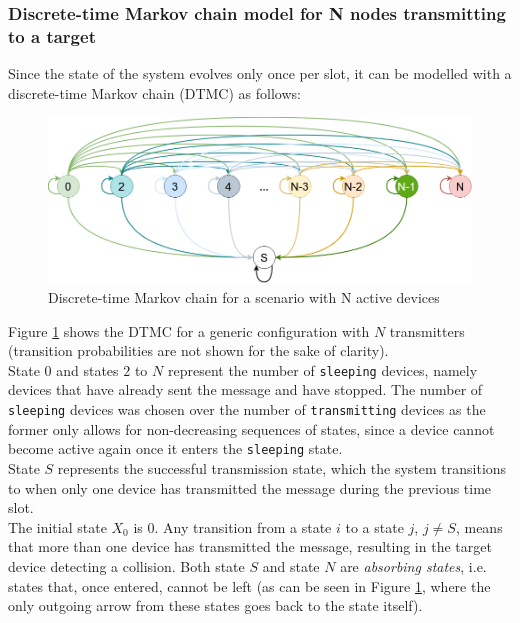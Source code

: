 \subsubsection{Discrete-time Markov chain model for N nodes transmitting to a target}
Since the state of the system evolves only once per slot, it can be modelled
with a discrete-time Markov chain (DTMC) as follows:
\begin{figure}[H]
    \begin{center}
        \includegraphics[scale=0.4]{img/DTMC.png}
        \caption{Discrete-time Markov chain for a scenario with N active devices}
        \label{fig:dtmc}
    \end{center}
\end{figure}
\noindent Figure \ref{fig:dtmc} shows the DTMC for a generic configuration with
$N$ transmitters (transition probabilities are not shown for the sake of clarity).\\
State $0$ and states $2$ to $N$ represent the number of \texttt{sleeping}
devices, namely devices that have already sent the message and have stopped. The
number of \texttt{sleeping} devices was chosen over the number of
\texttt{transmitting} devices as the former only allows for non-decreasing
sequences of states, since a device cannot become active again once it enters
the \texttt{sleeping} state.\\
State $S$ represents the successful transmission state, which the system
transitions to when only one device has transmitted the message during the
previous time slot.\\
The initial state $X_{0}$ is $0$. Any transition from a state $i$ to a state
$j$, $j \neq S$, means that more than one device has transmitted the message, 
resulting in the target device detecting a collision.
Both state $S$ and state $N$ are \textit{absorbing states}, i.e. states that,
once entered, cannot be left (as can be seen in Figure \ref{fig:dtmc}, where the
only outgoing arrow from these states goes back to the state itself).\\
